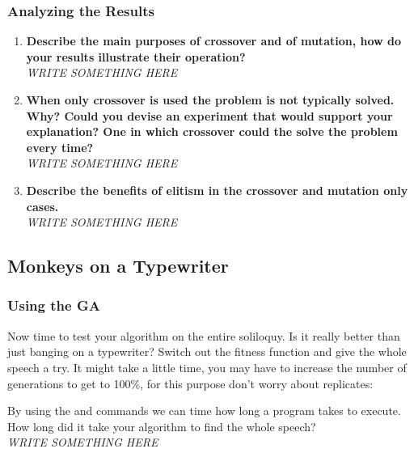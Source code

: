 \documentclass{article}
\begin{document}
\subsubsection{Analyzing the Results}
\begin{enumerate}
	\item \textbf{Describe the main purposes of crossover and of mutation, how do your results illustrate their operation?} \\
\textit{
 \color{red}WRITE SOMETHING HERE
 }

	\item \textbf{When only crossover is used the problem is not typically solved. Why? Could you devise an experiment that would support your explanation? One in which crossover could the solve the problem every time?}\\
\textit{
\color{red}WRITE SOMETHING HERE
 }
	
	\item \textbf{Describe the benefits of elitism in the crossover and mutation only cases.}\\
\textit{
\color{red}WRITE SOMETHING HERE
}

\end{enumerate}

\newpage
\subsection{Monkeys on a Typewriter}
\subsubsection{Using the GA}
Now time to test your algorithm on the entire soliloquy. Is it really better than just banging on a typewriter? Switch out the fitness function and give the whole speech a try. It might take a little time, you may have to increase the number of generations to get to 100\%, for this purpose don't worry about replicates:



By using the  and  commands we can time how long a program takes to execute. How long did it take your algorithm to find the whole speech?\\
\textit{
\color{red}WRITE SOMETHING HERE
}
\end{document}
